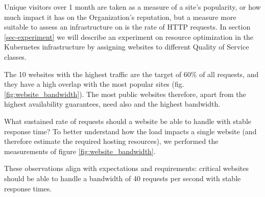 Unique visitors over 1 month are taken as a measure of a site's popularity, or how much impact it has on the Organization's reputation,
but a measure more suitable to assess an infrastructure on is the rate of HTTP requests.
In section \ref{sec-experiment} we will describe an experiment on resource optimization in the Kubernetes infrastructure
by assigning websites to different Quality of Service classes.

The 10 websites with the highest traffic are the target of 60\% of all requests, and they have a high overlap with the most popular sites (fig. \ref{fig:website_bandwidth}).
The most public websites therefore, apart from the highest availability guarantees, need also and the highest bandwidth.

What sustained rate of requests should a website be able to handle with stable response time?
To better understand how the load impacts a single website (and therefore estimate the required hosting resources),
we performed the measurements of figure \ref{fig:website_bandwidth}.

These observations align with expectations and requirements: critical websites should be able to handle a bandwidth of 40 requests per second with stable response times.
